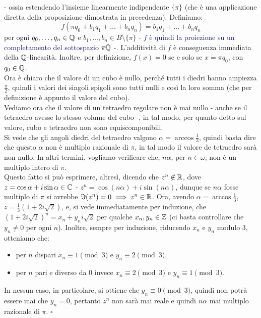 	- ossia estendendo l'insieme linearmente indipendente $\{\pi\}$ (che è una applicazione diretta della proposizione dimostrata in precedenza).
	Definiamo:
	\[ f(\pi q_0 + b_1 q_1 + \ldots + b_n q_n) = b_1 q_1 + \ldots + b_nq_n
		\]
	per ogni $q_0,\ldots,q_n \in \mathbb Q$ e $b_1,\ldots,b_n \in B \setminus \{\pi\}$ \textcolor{MidnightBlue}{- $f$ è quindi la proiezione su un completamento del sottospazio $\pi \mathbb Q$ -}. L'additività di $f$ è conseguenza immediata della $\mathbb Q$-linearità.
	Inoltre, per definizione, $f(x) = 0$ se e solo se $x = \pi q_0$, con $q_0 \in \mathbb Q$.\\
	Ora è chiaro che il valore di un cubo è nullo, perché tutti i diedri hanno ampiezza $\frac{\pi}{2}$, quindi i valori dei singoli spigoli sono tutti nulli e così la loro somma (che per definizione è appunto il valore del cubo).\\
	Vediamo ora che il valore di un tetraedro regolare non è mai nullo - anche se il tetraedro avesse lo stesso volume del cubo -, in tal modo, per quanto detto sul valore, cubo e tetraedro non sono equiscomponibili.\\
	Si vede che gli angoli diedri del tetraedro valgono $\alpha = \arccos\frac 13$, quindi basta dire che questo $\alpha$ non è multiplo razionale di $\pi$, in tal modo il valore de tetraedro sarà non nullo. In altri termini,
	vogliamo verificare che, $n\alpha$, per $n \in \omega$, non è un multiplo intero di $\pi$.\\
	Questo fatto si può esprimere, altresì, dicendo che $z^n \not\in \mathbb R$, dove $z = \cos \alpha + i \sin \alpha \in \mathbb C$ - $z^n = \cos(n\alpha) + i \sin(n\alpha)$, dunque se $n\alpha$ fosse multiplo di $\pi$ si avrebbe $\Im(z^n) = 0 \implies z^n \in \mathbb R$.
	Ora, avendo $\alpha = \arccos \frac 13$, $z = \frac{1}{3}(1 + 2i \sqrt 2)$, e, si vede immediatamente per induzione, che
	$(1 + 2i\sqrt 2)^n = x_n + y_n i \sqrt 2$ per qualche $x_n,y_n \in \mathbb Z$ (ci basta controllare che $y_n \ne 0$ per ogni $n$). Inoltre, sempre per induzione, riducendo $x_n$ e $y_n$ modulo 3, otteniamo che:
	\begin{itemize}
		\item per $n$ dispari $x_n \equiv 1 \pmod 3$ e $y_n \equiv 2 \pmod 3$.
		\item per $n$ pari e diverso da 0 invece $x_n \equiv 2 \pmod 3$ e $y_n \equiv 1 \pmod 3$.
	\end{itemize}
	In nessun caso, in particolare, si ottiene che $y_n \equiv 0 \pmod 3$, quindi non potrà essere mai che $y_n = 0$, pertanto $z^n$ non sarà mai reale e quindi $n\alpha$ mai multiplo razionale di $\pi$. \hfill $\square$
\newpage
